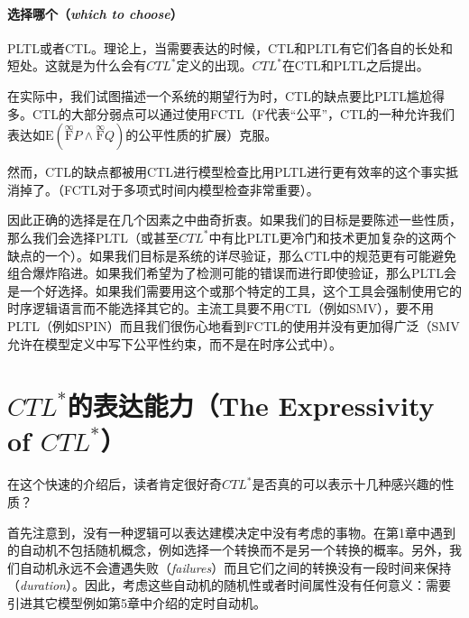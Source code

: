 \documentclass{book}
\begin{document}
    \paragraph{选择哪个（{\itshape  which to choose}）}PLTL或者CTL。理论上，当需要表达的时候，CTL和PLTL有它们各自的长处和短处。这就是为什么会有$CTL^*$定义的出现。$CTL^*$在CTL和PLTL之后提出。
    
    在实际中，我们试图描述一个系统的期望行为时，CTL的缺点要比PLTL尴尬得多。CTL的大部分弱点可以通过使用FCTL（F代表“公平”，CTL的一种允许我们表达如$\mathrm{E}(\overset{\infty}{\mathrm{F}}P\wedge\overset{\infty}{\mathrm{F}}Q)$的公平性质的扩展）克服。
    
    然而，CTL的缺点都被用CTL进行模型检查比用PLTL进行更有效率的这个事实抵消掉了。（FCTL对于多项式时间内模型检查非常重要）。
    
    因此正确的选择是在几个因素之中曲奇折衷。如果我们的目标是要陈述一些性质，那么我们会选择PLTL（或甚至$CTL^*$中有比PLTL更冷门和技术更加复杂的这两个缺点的一个）。如果我们目标是系统的详尽验证，那么CTL中的规范更有可能避免组合爆炸陷进。如果我们希望为了检测可能的错误而进行即使验证，那么PLTL会是一个好选择。如果我们需要用这个或那个特定的工具，这个工具会强制使用它的时序逻辑语言而不能选择其它的。主流工具要不用CTL（例如SMV），要不用PLTL（例如SPIN）而且我们很伤心地看到FCTL的使用并没有更加得广泛（SMV允许在模型定义中写下公平性约束，而不是在时序公式中）。
    
    \section{$CTL^*$的表达能力（The Expressivity of $CTL^*$）}
    
    \quad 在这个快速的介绍后，读者肯定很好奇$CTL^*$是否真的可以表示十几种感兴趣的性质？
    
    首先注意到，没有一种逻辑可以表达建模决定中没有考虑的事物。在第1章中遇到的自动机不包括随机概念，例如选择一个转换而不是另一个转换的概率。另外，我们自动机永远不会遭遇失败（{\itshape failures}）而且它们之间的转换没有一段时间来保持（{\itshape duration}）。因此，考虑这些自动机的随机性或者时间属性没有任何意义：需要引进其它模型例如第5章中介绍的定时自动机。
    
\end{document}

